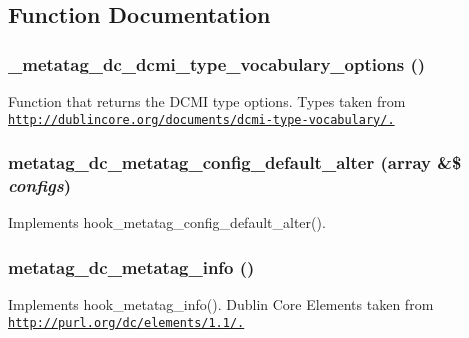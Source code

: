 \subsection{Function Documentation}
\hypertarget{metatag__dc_8metatag_8inc_a45c2c896b1c8e906f978c6f3969238a5}{
\subsubsection[{\_\-metatag\_\-dc\_\-dcmi\_\-type\_\-vocabulary\_\-options}]{\setlength{\rightskip}{0pt plus 5cm}\_\-metatag\_\-dc\_\-dcmi\_\-type\_\-vocabulary\_\-options ()}}
\label{metatag__dc_8metatag_8inc_a45c2c896b1c8e906f978c6f3969238a5}
Function that returns the DCMI type options. Types taken from \href{http://dublincore.org/documents/dcmi-type-vocabulary/.}{\tt http://dublincore.org/documents/dcmi-\/type-\/vocabulary/.} \hypertarget{metatag__dc_8metatag_8inc_ace253be8e874772b4405cf633c1e6ec8}{
\subsubsection[{metatag\_\-dc\_\-metatag\_\-config\_\-default\_\-alter}]{\setlength{\rightskip}{0pt plus 5cm}metatag\_\-dc\_\-metatag\_\-config\_\-default\_\-alter (array \&\$ {\em configs})}}
\label{metatag__dc_8metatag_8inc_ace253be8e874772b4405cf633c1e6ec8}
Implements hook\_\-metatag\_\-config\_\-default\_\-alter(). \hypertarget{metatag__dc_8metatag_8inc_adce300d61c1ae365a1ded27caee47c30}{
\subsubsection[{metatag\_\-dc\_\-metatag\_\-info}]{\setlength{\rightskip}{0pt plus 5cm}metatag\_\-dc\_\-metatag\_\-info ()}}
\label{metatag__dc_8metatag_8inc_adce300d61c1ae365a1ded27caee47c30}
Implements hook\_\-metatag\_\-info(). Dublin Core Elements taken from \href{http://purl.org/dc/elements/1.1/.}{\tt http://purl.org/dc/elements/1.1/.} 